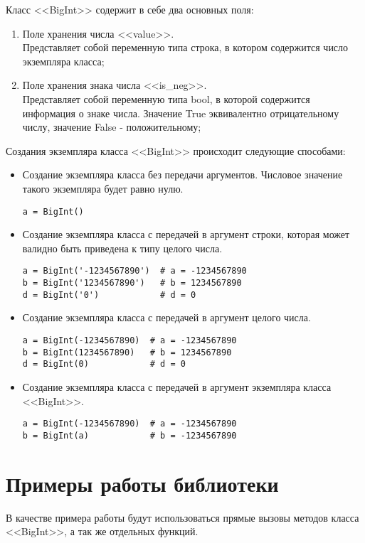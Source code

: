 Класс <<BigInt>> содержит в себе два основных поля:
\begin{enumerate}
    \item Поле хранения числа <<value>>.\\
    Представляет собой переменную типа строка, в котором содержится число экземпляра класса;
    \item Поле хранения знака числа <<is\_neg>>.\\
    Представляет собой переменную типа bool, в которой содержится информация о знаке числа.
    Значение True эквивалентно отрицательному числу, значение False - положительному;
\end{enumerate}

Создания экземпляра класса <<BigInt>> происходит следующие способами:
\begin{itemize}
    \item Создание экземпляра класса без передачи аргументов. Числовое значение такого экземпляра будет равно нулю.
    \begin{lstlisting}
a = BigInt()\end{lstlisting}
    \item Создание экземпляра класса с передачей в аргумент строки, которая может валидно быть приведена к типу целого числа.
    \begin{lstlisting}
a = BigInt('-1234567890')  # a = -1234567890
b = BigInt('1234567890')   # b = 1234567890
d = BigInt('0')            # d = 0\end{lstlisting}
    \item Создание экземпляра класса с передачей в аргумент целого числа.
    \begin{lstlisting}
a = BigInt(-1234567890)  # a = -1234567890
b = BigInt(1234567890)   # b = 1234567890
d = BigInt(0)            # d = 0\end{lstlisting}
    \item Создание экземпляра класса с передачей в аргумент экземпляра класса <<BigInt>>.
    \begin{lstlisting}
a = BigInt(-1234567890)  # a = -1234567890
b = BigInt(a)            # b = -1234567890\end{lstlisting}
\end{itemize}


\clearpage
\section{Примеры работы библиотеки}
В качестве примера работы будут использоваться прямые вызовы методов класса <<BigInt>>, а так же отдельных функций.


